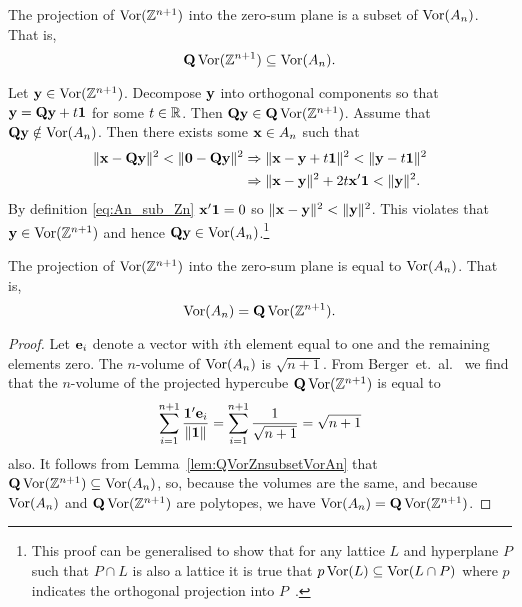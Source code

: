 \documentclass[draftcls, onecolumn, 11pt]{IEEEtran}
\begin{document}
\begin{lemma} \label{lem:QVorZnsubsetVorAn}
The projection of $\operatorname{Vor}({\mathbb Z}^{n+1})$ into the zero-sum plane is a subset of $\operatorname{Vor}(A_{n})$.  That is,
\[
\mathbf{Q}\operatorname{Vor}({\mathbb Z}^{n+1}) \subseteq \operatorname{Vor}(A_{n}).
\]
\end{lemma}
\begin{IEEEproof}
Let $\mathbf{y} \in \operatorname{Vor}({\mathbb Z}^{n+1})$.  Decompose $\mathbf{y}$ into orthogonal components so that $\mathbf{y} = \mathbf{Q} \mathbf{y} + t \boldsymbol{1}$ for some $t \in {\mathbb R}$.  Then $\mathbf{Q}\mathbf{y} \in \mathbf{Q}\operatorname{Vor}({\mathbb Z}^{n+1})$.  Assume that $\mathbf{Q}\mathbf{y} \notin \operatorname{Vor}(A_n)$.  Then there exists some $\mathbf{x} \in A_n$ such that
\begin{align*}
\|\mathbf{x} - \mathbf{Q}\mathbf{y}\|^2 < \|\boldsymbol{0} - \mathbf{Q}\mathbf{y}\|^2 & \Rightarrow \|\mathbf{x} - \mathbf{y} + t\boldsymbol{1}\|^2 < \|\mathbf{y} - t\boldsymbol{1}\|^2 \\
& \Rightarrow \|\mathbf{x} - \mathbf{y}\|^2 + 2t\mathbf{x}'\boldsymbol{1} < \|\mathbf{y}\|^2.
\end{align*}
By definition \eqref{eq:An_sub_Zn} $\mathbf{x}'\boldsymbol{1} = 0$ so $\|\mathbf{x} - \mathbf{y}\|^2 < \|\mathbf{y}\|^2$.  This violates that $\mathbf{y} \in \operatorname{Vor}({\mathbb Z}^{n+1})$ and hence $\mathbf{Q}\mathbf{y} \in \operatorname{Vor}(A_n)$.\footnote{This proof can be generalised to show that for any lattice $L$ and hyperplane $P$ such that $P\cap L$ is also a lattice it is true that $p\operatorname{Vor}(L) \subseteq \operatorname{Vor}(L \cap P)$ where $p$ indicates the orthogonal projection into $P$~\cite[Lemma~2.1]{McKilliam2010thesis}.}
\end{IEEEproof}

\begin{theorem}  \label{thm:VorAn=QVorZn1}
The projection of $\operatorname{Vor}({\mathbb Z}^{n+1})$ into the zero-sum plane is equal to $\operatorname{Vor}(A_{n})$. That is,
\[
\operatorname{Vor}(A_n) = \mathbf{Q}\operatorname{Vor}({\mathbb Z}^{n+1}).
\]
\end{theorem}
\begin{proof}
Let $\mathbf{e}_i$ denote a vector with $i$th element equal to one and the remaining elements zero.  The $n$-volume of $\operatorname{Vor}(A_n)$ is $\sqrt{n + 1}$.  From Berger~et.~al.~\cite[Theorem 1.1]{Burger1996} we find that the $n$-volume of the projected hypercube $\mathbf{Q}\operatorname{Vor}({\mathbb Z}^{n+1})$ is equal to
\[
\sum_{i = 1}^{n+1} \frac{\boldsymbol{1}^\prime \mathbf{e}_i}{\|\boldsymbol{1}\|} =  \sum_{i = 1}^{n+1} \frac{1}{\sqrt{n+1}} = \sqrt{n + 1}
\]
also. It follows from Lemma~\ref{lem:QVorZnsubsetVorAn} that $\mathbf{Q}\operatorname{Vor}({\mathbb Z}^{n+1}) \subseteq \operatorname{Vor}(A_n)$, so, because the volumes are the same, and because $\operatorname{Vor}(A_n)$ and $\mathbf{Q}\operatorname{Vor}({\mathbb Z}^{n+1})$ are polytopes, we have $\operatorname{Vor}(A_n) = \mathbf{Q}\operatorname{Vor}({\mathbb Z}^{n+1})$.
\end{proof}
\end{document}
